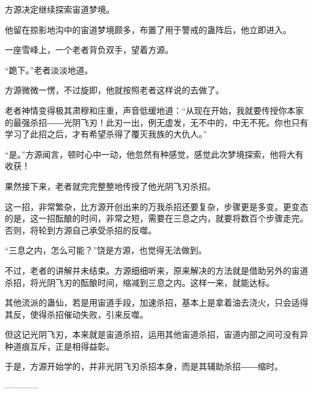 \begin{this_body}
方源决定继续探索宙道梦境。

他留在掠影地沟中的宙道梦境颇多，布置了用于警戒的蛊阵后，他立即进入。

一座雪峰上，一个老者背负双手，望着方源。

“跪下。”老者淡淡地道。

方源微微一愣，不过旋即，他就按照老者这样说的去做了。

老者神情变得极其肃穆和庄重，声音低缓地道：“从现在开始，我就要传授你本家的最强杀招――光阴飞刃！此刃一出，例无虚发，无不中的，中无不死。你也只有学习了此招之后，才有希望杀得了覆灭我族的大仇人。”

“是。”方源闻言，顿时心中一动，他忽然有种感觉，感觉此次梦境探索，他将大有收获！

果然接下来，老者就完完整整地传授了他光阴飞刃杀招。

这一招，非常繁杂，比方源开创出来的万我杀招还要复杂，步骤更是多变。更变态的是，这一招酝酿的时间，非常之短，需要在三息之内，就要将数百个步骤走完。否则，将轮到方源自己承受杀招的反噬。

“三息之内，怎么可能？”饶是方源，也觉得无法做到。

不过，老者的讲解并未结束。方源细细听来，原来解决的方法就是借助另外的宙道杀招，将光阴飞刃的酝酿时间，缩减到三息之内。这样一来，就能达标。

其他流派的蛊仙，若是用宙道手段，加速杀招，基本上是拿着油去浇火，只会适得其反，使得杀招催动失败，引来反噬。

但这记光阴飞刃，本来就是宙道杀招，运用其他宙道杀招，宙道内部之间可没有异种道痕互斥，正是相得益彰。

于是，方源开始学的，并非光阴飞刃杀招本身，而是其辅助杀招――缩时。

------------

\end{this_body}

